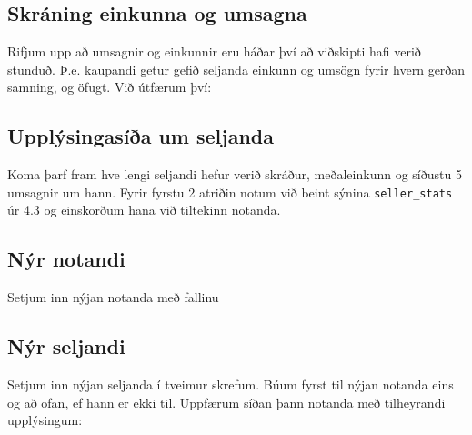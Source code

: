 \documentclass[a4paper,icelandic]{article}
\theoremstyle{definition} \newtheorem{skilgr}{Skilgreining}
\theoremstyle{plain}      \newtheorem{setn}{Setning}
\theoremstyle{remark}     \newtheorem*{lausn}{Lausn}
\begin{document}
\subsection{Skráning einkunna og umsagna}

Rifjum upp að umsagnir og einkunnir eru háðar því að viðskipti hafi verið
stunduð. Þ.e. kaupandi getur gefið seljanda einkunn og umsögn fyrir hvern gerðan
samning, og öfugt. Við útfærum því:


\subsection{Upplýsingasíða um seljanda}
Koma þarf fram hve lengi seljandi hefur verið skráður, meðaleinkunn og síðustu 5
umsagnir um hann. Fyrir fyrstu 2 atriðin notum við beint sýnina
\verb|seller_stats| úr 4.3 og einskorðum hana við tiltekinn notanda.


\subsection{Nýr notandi}
Setjum inn nýjan notanda með fallinu


\subsection{Nýr seljandi}
Setjum inn nýjan seljanda í tveimur skrefum. Búum fyrst til nýjan notanda eins
og að ofan, ef hann er ekki til. Uppfærum síðan þann notanda með tilheyrandi
upplýsingum:

\end{document}
